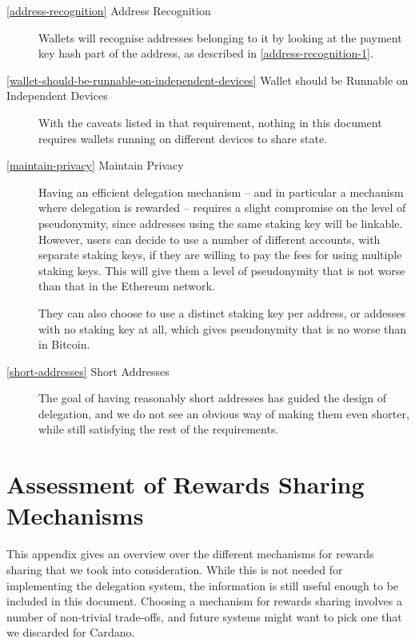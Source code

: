\documentclass[11pt,a4paper]{article}
\begin{document}
\begin{description}
\item[\cref{address-recognition} Address Recognition] Wallets will
  recognise addresses belonging to it by looking at the payment key
  hash part of the address, as described in
  \cref{address-recognition-1}.

\item[\cref{wallet-should-be-runnable-on-independent-devices} Wallet
  should be Runnable on Independent Devices] With the caveats listed
  in that requirement, nothing in this document requires wallets
  running on different devices to share state.

\item[\cref{maintain-privacy} Maintain Privacy] Having an efficient
  delegation mechanism -- and in particular a mechanism where
  delegation is rewarded -- requires a slight compromise on the level
  of pseudonymity, since addresses using the same staking key will be
  linkable. However, users can decide to use a number of different
  accounts, with separate staking keys, if they are willing to pay the
  fees for using multiple staking keys. This will give them a level of
  pseudonymity that is not worse than that in the Ethereum network.

  They can also choose to use a distinct staking key per address, or addesses
  with no staking key at all, which gives pseudonymity that is no worse than in
  Bitcoin.

\item[\cref{short-addresses} Short Addresses] The goal of having
  reasonably short addresses has guided the design of delegation, and
  we do not see an obvious way of making them even shorter, while
  still satisfying the rest of the requirements.

\end{description}

\appendix

\section{Assessment of Rewards Sharing Mechanisms}
\label{assessment-of-rewards-sharing-mechanisms}

This appendix gives an overview over the different mechanisms for
rewards sharing that we took into consideration. While this is not
needed for implementing the delegation system, the information is
still useful enough to be included in this document. Choosing a
mechanism for rewards sharing involves a number of non-trivial
trade-offs, and future systems might want to pick one that we
discarded for Cardano.
\end{document}
